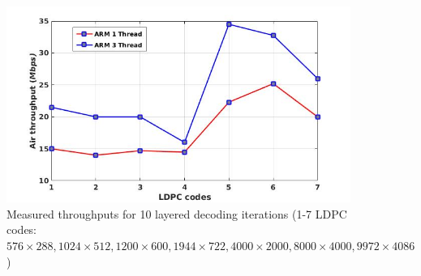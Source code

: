 \documentclass[conference]{IEEEtran}
\begin{document}
\begin{figure}[h]
\begin{centering}
\includegraphics[scale=0.35]{air.jpg}
\caption[width=.5\textwidth]{Measured throughputs for 10 layered decoding iterations (1-7 LDPC codes: $576 \times 288, 1024 \times 512, 1200 \times 600, 1944 \times 722, 4000 \times 2000, 8000 \times 4000, 9972 \times 4086$)}\label{fig::air}
\end{centering}
\end{figure}
\end{document}

